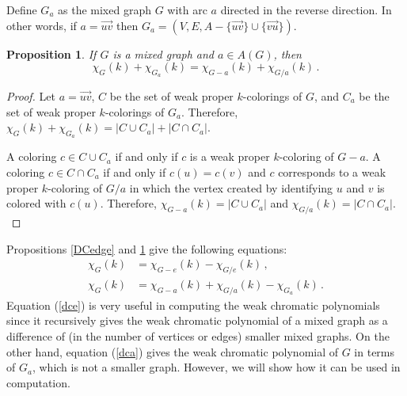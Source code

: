 \documentclass[11pt]{amsart}
\newtheorem{proposition}[theorem]{Proposition}
\begin{document}
Define $G_{a}$ as the mixed graph $G$ with arc $a$ directed in the reverse direction. In other words, if $a=\vec{uv}$ then $G_{a} = (V,E,A-\{\vec{uv}\} \cup \{\vec{vu}\})$.  

\begin{proposition}\label{DCarc} 
If $G$ is a mixed graph and $a \in A(G)$, then $$\chi_G(k) + \chi_{G_{a}}(k) = \chi_{G-a}(k) + \chi_{G/a}(k) \, .$$
\end{proposition}

\begin{proof}
Let $a=\vec{uv}$, $C$ be the set of weak proper $k$-colorings of $G$, and $C_a$ be the set of weak proper $k$-colorings of $G_a$. Therefore, $\chi_G(k) + \chi_{G_{a}}(k) = |C \cup C_a| + |C \cap C_a|$.

A coloring $c \in C \cup C_a$ if and only if $c$ is a weak proper $k$-coloring of $G-a$. A coloring $c \in C \cap C_a$ if and only if $c(u) = c(v)$ and $c$ corresponds to a weak proper $k$-coloring of $G/a$ in which the vertex created by identifying $u$ and $v$ is colored with $c(u)$. Therefore, $\chi_{G-a}(k) = |C \cup C_a|$ and $\chi_{G/a}(k) = |C \cap C_a|.$
%
\end{proof}

Propositions \ref{DCedge} and \ref{DCarc} give the following equations:
\begin{align}
\label{dce} \chi_G(k) &= \chi_{G-e}(k) - \chi_{G/e}(k) \, , \\
\label{dca} \chi_G(k) &= \chi_{G-a}(k) + \chi_{G/a}(k) - \chi_{G_{a}}(k) \, .
\end{align} 
Equation (\ref{dce}) is very useful in computing the weak chromatic polynomials since it recursively gives the weak chromatic polynomial of a mixed graph as a
difference of (in the number of vertices or edges) smaller mixed graphs. On the other hand, equation (\ref{dca}) gives the weak chromatic polynomial of $G$ in terms of $G_a$, which is not a smaller graph. However, we will show how it can be used in computation.
\end{document}
